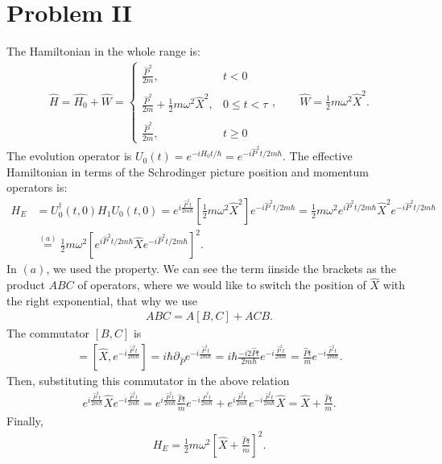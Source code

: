 \documentclass[letterpaper,11pt,twoside]{article}
\begin{document}
\section*{Problem II}
The Hamiltonian in the whole range is:
\begin{align*}
  \hat{H}=\hat{H_0}+\hat{W}=\begin{cases}
    \frac{\hat{P}^2}{2m},&t<0\\\\
    \frac{\hat{P}^2}{2m}+\frac{1}{2}m\omega^2\hat{X}^2,&0\leq t<\tau\\\\
    \frac{\hat{P}^2}{2m},&t\geq0
  \end{cases},\qquad\hat{W}=\frac{1}{2}m\omega^2\hat{X}^2.
\end{align*}
The evolution operator is $U_0(t)=e^{-iH_0t/\hbar}=e^{-i\hat{P}^2t/2m\hbar}$.
The effective Hamiltonian in terms of the Schrodinger picture position and momentum operators is:
\begin{align*}
  H_E&=U^\dagger_0(t,0)H_1U_0(t,0)=e^{i\frac{\hat{P}^2t}{2m\hbar}}\left[\frac{1}{2}m\omega^2\hat{X}^2\right]e^{-i\hat{P}^2t/2m\hbar}=\frac{1}{2}m\omega^2e^{i\hat{P}^2t/2m\hbar}\hat{X}^2e^{-i\hat{P}^2t/2m\hbar}\\
  &\stackrel{(a)}{=}\frac{1}{2}m\omega^2\left[e^{i\hat{P}^2t/2m\hbar}\hat{X}e^{-i\hat{P}^2t/2m\hbar}\right]^2.
\end{align*}
In $(a)$, we used the property. We can see the term iinside the brackets as the product $ABC$ of operators, where we would like to switch the position of $\hat{X}$ with the right exponential, that why we use 
\begin{align*}
  ABC=A[B,C]+ACB.
\end{align*}
The commutator $[B,C]$ is
\begin{align*}
  [B,C]=[\hat{X},e^{-i\frac{\hat{P}^2t}{2m\hbar}}]=i\hbar\partial_{\hat{P}}e^{-i\frac{\hat{P}^2t}{2m\hbar}}=i\hbar\frac{-i2\hat{P}t}{2m\hbar}e^{-i\frac{\hat{P}^2t}{2m\hbar}}=\frac{\hat{P}t}{m}e^{-i\frac{\hat{P}^2t}{2m\hbar}}.
\end{align*}
Then, substituting this commutator in the above relation
\begin{align*}
  e^{i\frac{\hat{P}^2t}{2m\hbar}}\hat{X}e^{-i\frac{\hat{P}^2t}{2m\hbar}}=e^{i\frac{\hat{P}^2t}{2m\hbar}}\frac{\hat{P}t}{m}e^{-i\frac{\hat{P}^2t}{2m\hbar}}+e^{i\frac{\hat{P}^2t}{2m\hbar}}e^{-i\frac{\hat{P}^2t}{2m\hbar}}\hat{X}=\hat{X}+\frac{\hat{P}t}{m}.
\end{align*}
Finally,
\begin{align*}
  H_E=\frac{1}{2}m\omega^2\left[\hat{X}+\frac{\hat{P}t}{m}\right]^2.
\end{align*}
\end{document}
